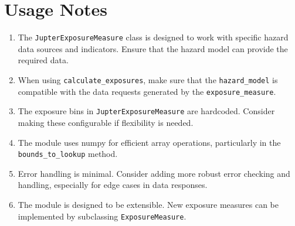 \documentclass{article}
\begin{document}
\section{Usage Notes}

\begin{enumerate}
    \item The \texttt{JupterExposureMeasure} class is designed to work with specific hazard data sources and indicators. Ensure that the hazard model can provide the required data.

    \item When using \texttt{calculate\_exposures}, make sure that the \texttt{hazard\_model} is compatible with the data requests generated by the \texttt{exposure\_measure}.

    \item The exposure bins in \texttt{JupterExposureMeasure} are hardcoded. Consider making these configurable if flexibility is needed.

    \item The module uses numpy for efficient array operations, particularly in the \texttt{bounds\_to\_lookup} method.

    \item Error handling is minimal. Consider adding more robust error checking and handling, especially for edge cases in data responses.

    \item The module is designed to be extensible. New exposure measures can be implemented by subclassing \texttt{ExposureMeasure}.
\end{enumerate}
\end{document}
